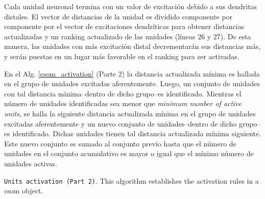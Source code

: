 {Cada unidad neuronal termina con un valor de excitación debido a sus dendritas distales. El vector de distancias de la unidad es dividido componente por componente por el vector de excitaciones dendríticas para obtener distancias actualizadas y un ranking actualizado de las unidades (líneas 26 y 27). De esta manera, las unidades con más excitación distal decrementarán sus distancias más, y serán puestas en un lugar más favorable en el ranking para ser activadas.

En el Alg. \ref{csom_activation} (Parte 2) la distancia actualizada mínima es hallada en el grupo de unidades excitadas aferentemente. Luego, un conjunto de unidades con tal distancia mínima--dentro de dicho grupo--es identificado. Mientras el número de unidades identificadas sea menor que \emph{minimum number of active units}, se halla la siguiente distancia actualizada mínima en el grupo de unidades excitadas aferentemente y un nuevo conjunto de unidades--dentro de dicho grupo--es identificado. Dichas unidades tienen tal distancia actualizada mínima siguiente.
Este nuevo conjunto es sumado al conjunto previo hasta que el número de unidades en el conjunto acumulativo es mayor o igual que el mínimo número de unidades activas.

\begin{algorithm}
\ContinuedFloat
\caption{\texttt{Units activation (Part 2)}. This algorithm establishes the activation rules in a \gls{csom} object.}
\label{csom_activation}
\begin{algorithmic}[1]

	\ENDWHILE


\end{algorithmic}
\end{algorithm}}
